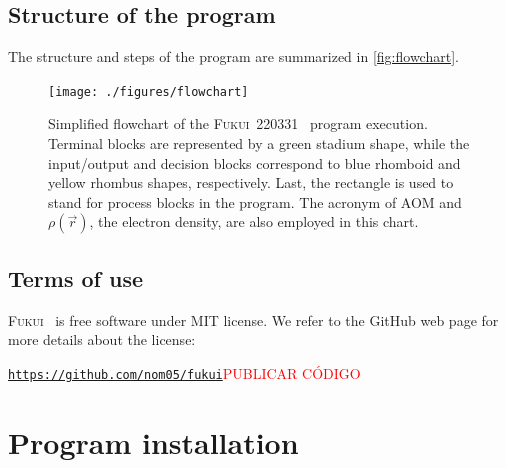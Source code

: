 \documentclass[a4paper,11pt,openany]{memoir}
\newcommand\versionprog{220331}
\newcommand\programa{\textsc{Fukui}}
\begin{document}
\section{Structure of the program}
The structure and steps of the program are summarized in \autoref{fig:flowchart}.

\begin{figure}
	\begin{center}
		\texttt{[image: ./figures/flowchart]}
		\caption{Simplified flowchart of the \programa~\versionprog~ program execution. Terminal blocks are represented by a green stadium shape, while the input/output and decision blocks correspond to blue rhomboid and yellow rhombus shapes, respectively. Last, the rectangle is used to stand for process blocks in the program. The acronym of \acf{AOM} and $\rho(\vec{r})$, the electron density, are also employed in this chart.}\label{fig:flowchart}
	\end{center}
\end{figure}

\section{Terms of use}
\programa~ is free software under MIT license. We refer to the GitHub web page for more details about the license:
\begin{center}
	\texttt{\url{https://github.com/nom05/fukui}}\textcolor{red}{PUBLICAR CÓDIGO}
\end{center}


\chapter{Program installation}

\end{document}
